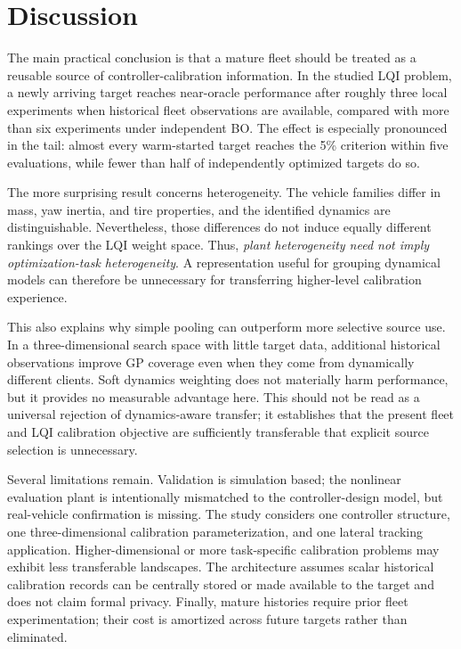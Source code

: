 \section{Discussion}
The main practical conclusion is that a mature fleet should be treated as a reusable source of controller-calibration information. In the studied LQI problem, a newly arriving target reaches near-oracle performance after roughly three local experiments when historical fleet observations are available, compared with more than six experiments under independent BO. The effect is especially pronounced in the tail: almost every warm-started target reaches the 5\% criterion within five evaluations, while fewer than half of independently optimized targets do so.

The more surprising result concerns heterogeneity. The vehicle families differ in mass, yaw inertia, and tire properties, and the identified dynamics are distinguishable. Nevertheless, those differences do not induce equally different rankings over the LQI weight space. Thus, \emph{plant heterogeneity need not imply optimization-task heterogeneity}. A representation useful for grouping dynamical models can therefore be unnecessary for transferring higher-level calibration experience.

This also explains why simple pooling can outperform more selective source use. In a three-dimensional search space with little target data, additional historical observations improve GP coverage even when they come from dynamically different clients. Soft dynamics weighting does not materially harm performance, but it provides no measurable advantage here. This should not be read as a universal rejection of dynamics-aware transfer; it establishes that the present fleet and LQI calibration objective are sufficiently transferable that explicit source selection is unnecessary.

Several limitations remain. Validation is simulation based; the nonlinear evaluation plant is intentionally mismatched to the controller-design model, but real-vehicle confirmation is missing. The study considers one controller structure, one three-dimensional calibration parameterization, and one lateral tracking application. Higher-dimensional or more task-specific calibration problems may exhibit less transferable landscapes. The architecture assumes scalar historical calibration records can be centrally stored or made available to the target and does not claim formal privacy. Finally, mature histories require prior fleet experimentation; their cost is amortized across future targets rather than eliminated.

